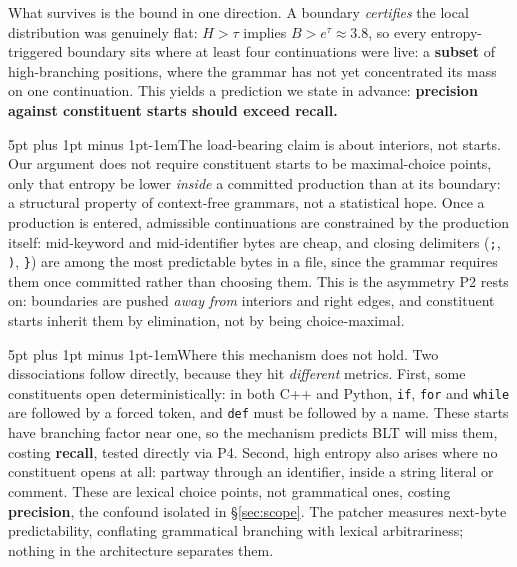 \documentclass[10pt]{article}
\makeatletter
\renewcommand\paragraph{\@startsection{paragraph}{4}{0pt}%
  {5pt plus 1pt minus 1pt}{-1em}{\normalfont\normalsize\bfseries}}
\newcommand{\code}[1]{\texttt{\small #1}}
\makeatother
\begin{document}
What survives is the bound in one direction. A boundary \emph{certifies} the
local distribution was genuinely flat: $H > \tau$ implies $B > e^{\tau} \approx
3.8$, so every entropy-triggered boundary sits where at least four
continuations were live: a \textbf{subset} of high-branching positions,
where the grammar has not yet concentrated its mass on one continuation. This
yields a prediction we state in advance: \textbf{precision against constituent
starts should exceed recall.}

\paragraph{The load-bearing claim is about interiors, not starts.}
Our argument does not require constituent starts to be maximal-choice points,
only that entropy be lower \emph{inside} a committed production than at its
boundary: a structural property of context-free grammars, not a statistical
hope. Once a production is entered, admissible continuations are constrained by
the production itself: mid-keyword and mid-identifier bytes are cheap, and
closing delimiters (\code{;}, \code{)}, \code{\}}) are among the most
predictable bytes in a file, since the grammar requires them once committed
rather than choosing them. This is the asymmetry P2 rests on: boundaries are
pushed \emph{away from} interiors and right edges, and constituent starts
inherit them by elimination, not by being choice-maximal.

\paragraph{Where this mechanism does not hold.}
Two dissociations follow directly, because they hit \emph{different} metrics.
First, some constituents open deterministically: in both C++ and Python,
\code{if}, \code{for} and \code{while} are followed by a forced token, and
\code{def} must be followed by a name. These starts have branching factor near
one, so the mechanism predicts BLT will miss them, costing \textbf{recall},
tested directly via P4. Second, high entropy also arises where no constituent
opens at all: partway through an identifier, inside a string literal or
comment. These are lexical choice points, not grammatical ones, costing
\textbf{precision}, the confound isolated in \S\ref{sec:scope}. The patcher
measures next-byte predictability, conflating grammatical branching with
lexical arbitrariness; nothing in the architecture separates them.
\end{document}
